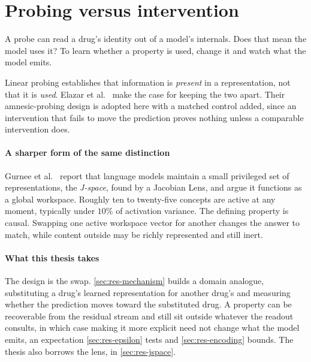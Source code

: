 \section{Probing versus intervention}
\label{sec:lit-interp}
\framedecl{-}

\begin{question}
A probe can read a drug's identity out of a model's internals. Does that mean the
model uses it? To learn whether a property is used, change it and watch what the
model emits.
\end{question}

\noindent
Linear probing establishes that information is \emph{present} in a
representation, not that it is \emph{used}. Elazar et al.~\cite{gurnee} make the
case for keeping the two apart. Their amnesic-probing design is adopted here with
a matched control added, since an intervention that fails to move the prediction
proves nothing unless a comparable intervention does.

\paragraph{A sharper form of the same distinction} Gurnee et al.~\cite{workspace}
report that language models maintain a small privileged set of representations,
the \emph{J-space}, found by a Jacobian Lens, and argue it functions as a global
workspace. Roughly ten to twenty-five concepts are active at any moment,
typically under $10\%$ of activation variance. The defining property is causal.
Swapping one active
workspace vector for another changes the answer to match, while content outside
may be richly represented and still inert.

\paragraph{What this thesis takes} The design is the swap.
\cref{sec:res-mechanism} builds a domain analogue, substituting a drug's learned
representation for another drug's and measuring whether the prediction moves
toward the substituted drug. A property can be recoverable from the residual
stream and still sit outside whatever the readout consults, in which case making
it more explicit need not change what the model emits, an expectation
\cref{sec:res-epsilon} tests and \cref{sec:res-encoding} bounds.
The thesis also borrows the lens, in \cref{sec:res-jspace}.

